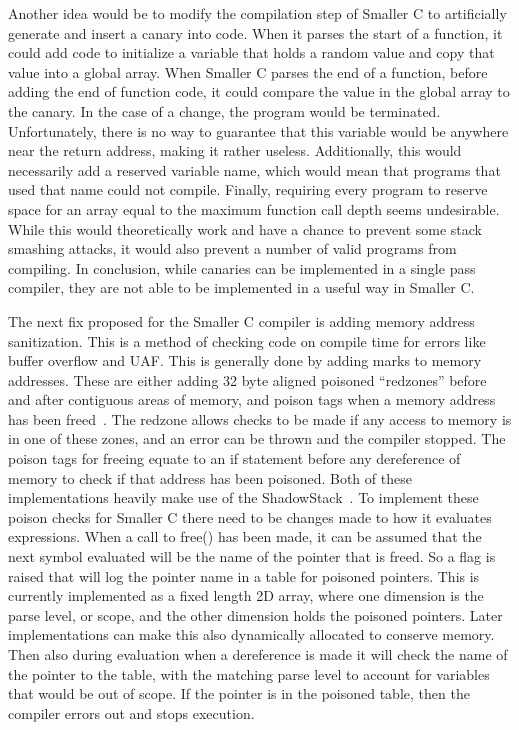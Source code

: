 \documentclass[sigconf, anonymous]{acmart}
\begin{document}
Another idea would be to modify the compilation step of Smaller C to artificially generate and insert a canary into code. When it parses the start of a function, it could add code to initialize a variable that holds a random value and copy that value into a global array. When Smaller C parses the end of a function, before adding the end of function code, it could compare the value in the global array to the canary. In the case of a change, the program would be terminated. Unfortunately, there is no way to guarantee that this variable would be anywhere near the return address, making it rather useless. Additionally, this would necessarily add a reserved variable name, which would mean that programs that used that name could not compile. Finally, requiring every program to reserve space for an array equal to the maximum function call depth seems undesirable. While this would theoretically work and have a chance to prevent some stack smashing attacks, it would also prevent a number of valid programs from compiling. In conclusion, while canaries can be implemented in a single pass compiler, they are not able to be implemented in a useful way in Smaller C.



The next fix proposed for the Smaller C compiler is adding memory address sanitization. This is a method of checking code on compile time for errors like buffer overflow and UAF. This is generally done by adding marks to memory addresses. These are either adding 32 byte aligned poisoned “redzones” before and after contiguous areas of memory, and poison tags when a memory address has been freed~\cite{AddressSanitizeWiki}. The redzone allows checks to be made if any access to memory is in one of these zones, and an error can be thrown and the compiler stopped. The poison tags for freeing equate to an if statement before any dereference of memory to check if that address has been poisoned. Both of these implementations heavily make use of the ShadowStack~\cite{Serebryany:AddressSanitize}. To implement these poison checks for Smaller C there need to be changes made to how it evaluates expressions. When a call to free() has been made, it can be assumed that the next symbol evaluated will be the name of the pointer that is freed. So a flag is raised that will log the pointer name in a table for poisoned pointers. This is currently implemented as a fixed length 2D array, where one dimension is the parse level, or scope, and the other dimension holds the poisoned pointers. Later implementations can make this also dynamically allocated to conserve memory. Then also during evaluation when a dereference is made it will check the name of the pointer to the table, with the matching parse level to account for variables that would be out of scope. If the pointer is in the poisoned table, then the compiler errors out and stops execution.
\end{document}
